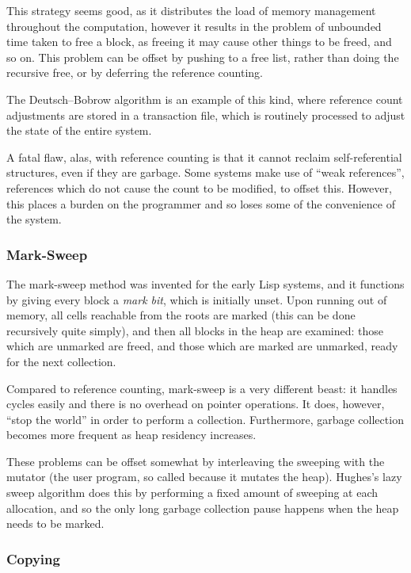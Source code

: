 This strategy seems good, as it distributes the load of memory
management throughout the computation, however it results in the
problem of unbounded time taken to free a block, as freeing it may
cause other things to be freed, and so on\cite{GarbageCollection}.
This problem can be offset by pushing to a free list, rather than
doing the recursive free, or by deferring the reference counting.

The Deutsch--Bobrow algorithm is an example of this kind, where
reference count adjustments are stored in a transaction file, which is
routinely processed to adjust the state of the entire
system\cite{Deutsch76}.

A fatal flaw, alas, with reference counting is that it cannot reclaim
self-referential structures, even if they are
garbage\cite{McBeth63}. Some systems make use of ``weak references'',
references which do not cause the count to be modified, to offset
this. However, this places a burden on the programmer and so loses
some of the convenience of the system.

\subsubsection{Mark-Sweep}

The mark-sweep method was invented for the early Lisp
systems\cite{McCarthy60}, and it functions by giving every block a
\textit{mark bit}, which is initially unset. Upon running out of
memory, all cells reachable from the roots are marked (this can be
done recursively quite simply), and then all blocks in the heap are
examined: those which are unmarked are freed, and those which are
marked are unmarked, ready for the next collection.

Compared to reference counting, mark-sweep is a very different beast:
it handles cycles easily and there is no overhead on pointer
operations. It does, however, ``stop the world'' in order to perform a
collection\cite{GarbageCollection}. Furthermore, garbage collection
becomes more frequent as heap residency increases.

These problems can be offset somewhat by interleaving the sweeping
with the mutator (the user program, so called because it mutates the
heap). Hughes's lazy sweep algorithm\cite{Hughes82} does this by
performing a fixed amount of sweeping at each allocation, and so the
only long garbage collection pause happens when the heap needs to be
marked.

\subsubsection{Copying}

